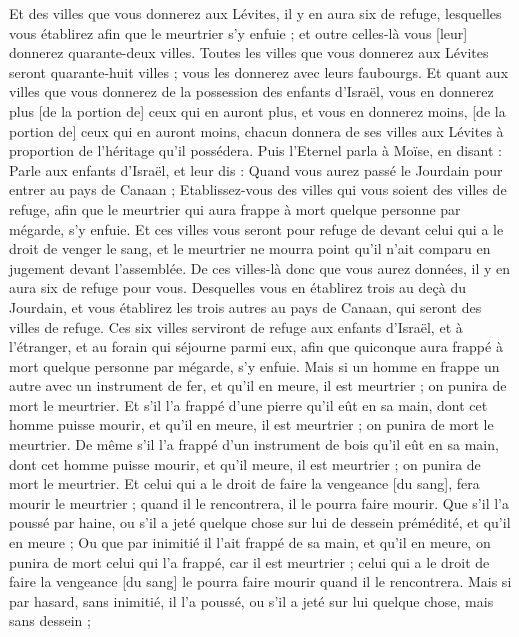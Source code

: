 \begin{multicols}{2}
Et des villes que vous donnerez aux Lévites, il y en aura six de refuge, lesquelles vous établirez afin que le meurtrier s'y enfuie ; et outre celles-là vous [leur] donnerez quarante-deux villes.
Toutes les villes que vous donnerez aux Lévites seront quarante-huit villes ; vous les donnerez avec leurs faubourgs.
Et quant aux villes que vous donnerez de la possession des enfants d'Israël, vous en donnerez plus [de la portion de] ceux qui en auront plus, et vous en donnerez moins, [de la portion de] ceux qui en auront moins, chacun donnera de ses villes aux Lévites à proportion de l'héritage qu'il possédera.
Puis l'Eternel parla à Moïse, en disant :
Parle aux enfants d'Israël, et leur dis : Quand vous aurez passé le Jourdain pour entrer au pays de Canaan ;
Etablissez-vous des villes qui vous soient des villes de refuge, afin que le meurtrier qui aura frappe à mort quelque personne par mégarde, s'y enfuie.
Et ces villes vous seront pour refuge de devant celui qui a le droit de venger le sang, et le meurtrier ne mourra point qu'il n'ait comparu en jugement devant l'assemblée.
De ces villes-là donc que vous aurez données, il y en aura six de refuge pour vous.
Desquelles vous en établirez trois au deçà du Jourdain, et vous établirez les trois autres au pays de Canaan, qui seront des villes de refuge.
Ces six villes serviront de refuge aux enfants d'Israël, et à l'étranger, et au forain qui séjourne parmi eux, afin que quiconque aura frappé à mort quelque personne par mégarde, s'y enfuie.
Mais si un homme en frappe un autre avec un instrument de fer, et qu'il en meure, il est meurtrier ; on punira de mort le meurtrier.
Et s'il l'a frappé d'une pierre qu'il eût en sa main, dont cet homme puisse mourir, et qu'il en meure, il est meurtrier ; on punira de mort le meurtrier.
De même s'il l'a frappé d'un instrument de bois qu'il eût en sa main, dont cet homme puisse mourir, et qu'il meure, il est meurtrier ; on punira de mort le meurtrier.
Et celui qui a le droit de faire la vengeance [du sang], fera mourir le meurtrier ; quand il le rencontrera, il le pourra faire mourir.
Que s'il l'a poussé par haine, ou s'il a jeté quelque chose sur lui de dessein prémédité, et qu'il en meure ;
Ou que par inimitié il l'ait frappé de sa main, et qu'il en meure, on punira de mort celui qui l'a frappé, car il est meurtrier ; celui qui a le droit de faire la vengeance [du sang] le pourra faire mourir quand il le rencontrera.
Mais si par hasard, sans inimitié, il l'a poussé, ou s'il a jeté sur lui quelque chose, mais sans dessein ;

\end{multicols}
